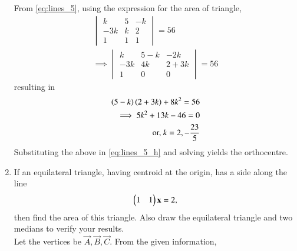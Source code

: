 \begin{enumerate}[label=\arabic*.,ref=\thesubsection.\theenumi]
From \eqref{eq:lines_5}, using the expression for the area of triangle,
\begin{align}
\begin{vmatrix}
k & 5 & -k\\-3k & k & 2 \\ 1 & 1 & 1
\end{vmatrix} = 56
\nonumber \\
\implies
\begin{vmatrix}
k & 5-k & -2k\\-3k & 4k & 2+3k \\ 1 & 0 & 0
\end{vmatrix} = 56
\end{align}
%
resulting in
\begin{align}
\left(5-k\right)
\left(2+3k\right)+8k^2=56
\\
\implies 5k^2+13k-46 = 0
\\
\text{or, } k = 2, -\frac{23}{5}
\end{align}
Substituting the above in \eqref{eq:lines_5_h} and solving yields the orthocentre.
\item If an equilateral triangle, having centroid at the origin, has a side along the line
\begin{equation}
\label{eq:lines_6_ab}
\begin{pmatrix}1 & 1\end{pmatrix}\mathbf{x} = 2,
\end{equation}
then find the area of this triangle. Also draw the equilateral triangle and two medians to verify your results.
\\
\solution Let the vertices be $\vec{A},\vec{B},\vec{C}$. From the given information, 

\end{enumerate}
